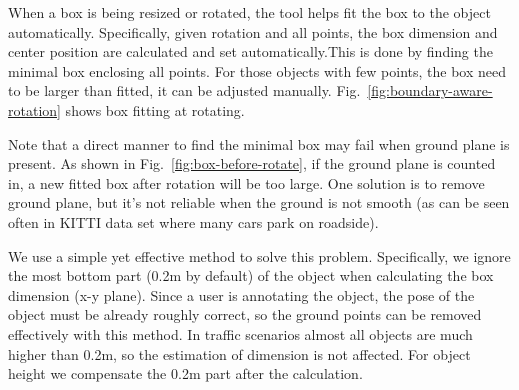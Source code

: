 \documentclass[letterpaper, 10 pt, conference]{ieeeconf}  %
\begin{document}
When a box is being resized or rotated, the tool helps fit the box to the object automatically. Specifically,  given rotation and all points, the box dimension and center position are calculated and set automatically.This is done by finding the minimal box enclosing all points. For those objects with few points, the box need to be larger than fitted, it can be adjusted manually. Fig.~\ref{fig:boundary-aware-rotation} shows box fitting at rotating. 

Note that a direct manner to find the minimal box may fail when ground plane is present. As shown in Fig.~\ref{fig:box-before-rotate}, if the ground plane is counted in, a new fitted box after rotation will be too large. One solution is to remove ground plane, but it's not reliable when the ground is not smooth (as can be seen often in KITTI data set\cite{Geiger2012CVPR} where many cars park on roadside).

We use a simple yet effective method to solve this problem. Specifically, we  ignore the most bottom part (0.2m by default) of the object when calculating the box dimension (x-y plane). Since a user is annotating the object, the pose of the object must be already roughly correct, so the  ground points can be removed effectively with this method. In traffic scenarios almost all objects are much higher than 0.2m, so the estimation of dimension is  not affected. For object height we compensate the 0.2m part after the calculation. 
\end{document}
